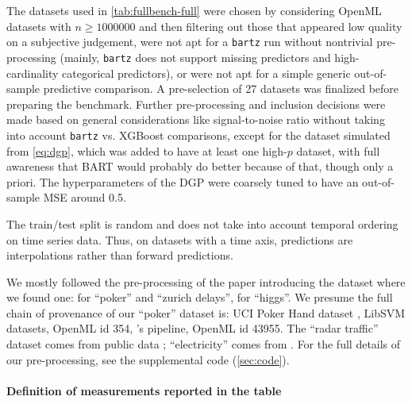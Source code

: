 \documentclass{article}
\begin{document}
The datasets used in \autoref{tab:fullbench-full} were chosen by considering
OpenML datasets with $n\ge\num{1000000}$ and then filtering out those that
appeared low quality on a subjective judgement, were not apt for a
\texttt{bartz} run without nontrivial pre-processing (mainly, \texttt{bartz}
does not support missing predictors and high-cardinality categorical
predictors), or were not apt for a simple generic out-of-sample predictive
comparison. A pre-selection of 27 datasets was finalized before preparing the
benchmark. Further pre-processing and inclusion decisions were made based on general considerations like signal-to-noise ratio without taking into account \texttt{bartz} vs.{} XGBoost comparisons, except for the dataset simulated from
\autoref{eq:dgp}, which was added to have at least one high-$p$ dataset, with full awareness that BART would probably do better because of that, though only a priori. The hyperparameters of the DGP were coarsely tuned to have an out-of-sample MSE around 0.5.

The train/test split is random and does not take into account temporal ordering
on time series data. Thus, on datasets with a time axis, predictions are
interpolations rather than forward predictions.

We mostly followed the pre-processing of the paper introducing the dataset
where we found one: \textcite{grinsztajn_why_2022} for ``poker'' and ``zurich
delays'', \textcite{baldi_searching_2014} for ``higgs''. We presume the full
chain of provenance of our ``poker'' dataset is: UCI Poker Hand dataset \autocite{poker_hand_158}, LibSVM
datasets, OpenML id 354, \textcite{grinsztajn_why_2022}'s pipeline, OpenML id
43955. The ``radar traffic'' dataset comes from public data
\autocite{austin2019radar}; ``electricity'' comes from \textcite{godahewa_2021_4659727}. For the full details of our pre-processing, see the
supplemental code (\autoref{sec:code}).

\paragraph{Definition of measurements reported in the table}
\end{document}
